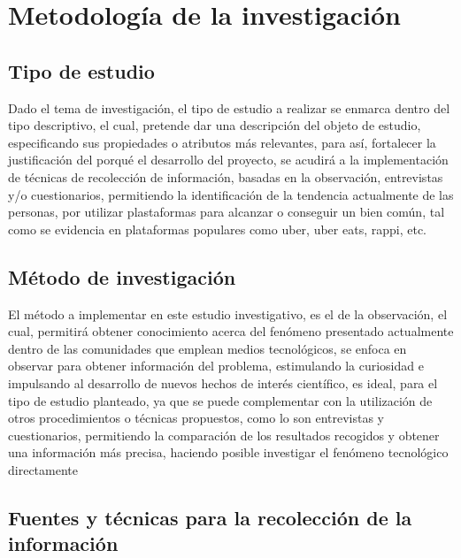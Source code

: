 \section{Metodología de la investigación}

	\subsection{Tipo de estudio}
	
	{Dado el tema de investigación, el tipo de estudio a realizar se enmarca dentro del tipo descriptivo, el cual, pretende dar una descripción del objeto de estudio, especificando sus propiedades o atributos más relevantes, para así, fortalecer la justificación del porqué el desarrollo del proyecto, se acudirá a la implementación de técnicas de recolección de información, basadas en la observación, entrevistas y/o cuestionarios, permitiendo la identificación de la tendencia actualmente de las personas, por utilizar plastaformas para alcanzar o conseguir un bien común, tal como se evidencia en plataformas populares como uber, uber eats, rappi, etc.}
	
	
	\subsection{Método de investigación}
	
	{El método a implementar en este estudio investigativo, es el de la observación, el cual, permitirá obtener conocimiento acerca del fenómeno presentado actualmente dentro de las comunidades que emplean medios tecnológicos, se enfoca en observar para obtener información del problema, estimulando la curiosidad e impulsando al desarrollo de nuevos hechos de interés científico, es ideal, para el tipo de estudio planteado, ya que se puede complementar con la utilización de otros procedimientos o técnicas propuestos, como lo son entrevistas y cuestionarios, permitiendo la comparación de los resultados recogidos y obtener una información más precisa, haciendo posible investigar el fenómeno tecnológico directamente}
	
	
	\subsection{Fuentes y técnicas para la recolección de la información}
	
